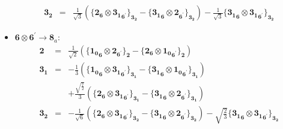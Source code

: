 \documentclass[english]{article}
\newcommand{\subcg}[3]{\big\{ {#1}\otimes{#2}\big\}^{}_{#3}}
\newcommand{\rep}[1]{\mathbf{#1}}
\begin{document}
\begin{itemize}
\begin{eqnarray*}
\\
\rep{3_2} &=& \frac{1}{\sqrt{3}}\left(\subcg{\rep{2}_{\rep{6}}}{\rep{3_1}_{\rep{6}^{\prime}}}{\rep{3_2}}-\subcg{\rep{3_1}_{\rep{6}}}{\rep{2}_{\rep{6}^{\prime}}}{\rep{3_2}}\right)-\frac{1}{\sqrt{3}}\subcg{\rep{3_1}_{\rep{6}}}{\rep{3_1}_{\rep{6}^{\prime}}}{\rep{3_2}}
\end{eqnarray*}
\item $\rep{6}\otimes\rep{6}^{\prime}\to\rep{8}_{a}$:
\begin{eqnarray*}
\rep{2} &=& \frac{1}{\sqrt{2}}\left(\subcg{\rep{1_0}_{\rep{6}}}{\rep{2}_{\rep{6}^{\prime}}}{\rep{2}}-\subcg{\rep{2}_{\rep{6}}}{\rep{1_0}_{\rep{6}^{\prime}}}{\rep{2}}\right)
\\
\rep{3_1} &=& -\frac{1}{3}\left(\subcg{\rep{1_0}_{\rep{6}}}{\rep{3_1}_{\rep{6}^{\prime}}}{\rep{3_1}}-\subcg{\rep{3_1}_{\rep{6}}}{\rep{1_0}_{\rep{6}^{\prime}}}{\rep{3_1}}\right) \\ 
 & & +\frac{\sqrt{\frac{7}{2}}}{3}\left(\subcg{\rep{2}_{\rep{6}}}{\rep{3_1}_{\rep{6}^{\prime}}}{\rep{3_1}}-\subcg{\rep{3_1}_{\rep{6}}}{\rep{2}_{\rep{6}^{\prime}}}{\rep{3_1}}\right)
\\
\rep{3_2} &=& -\frac{1}{\sqrt{6}}\left(\subcg{\rep{2}_{\rep{6}}}{\rep{3_1}_{\rep{6}^{\prime}}}{\rep{3_2}}-\subcg{\rep{3_1}_{\rep{6}}}{\rep{2}_{\rep{6}^{\prime}}}{\rep{3_2}}\right)-\sqrt{\frac{2}{3}}\subcg{\rep{3_1}_{\rep{6}}}{\rep{3_1}_{\rep{6}^{\prime}}}{\rep{3_2}}
\end{eqnarray*}
\end{itemize}
\end{document}
